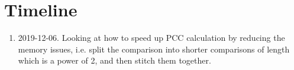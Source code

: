 \documentclass{article}
\begin{document}
\section*{Timeline}

\begin{enumerate}
\item 2019-12-06. Looking at how to speed up PCC calculation by reducing the memory issues, i.e. split the comparison into shorter comparisons of length which is a power of 2, and then  stitch them together.
\end{enumerate}
\end{document}
